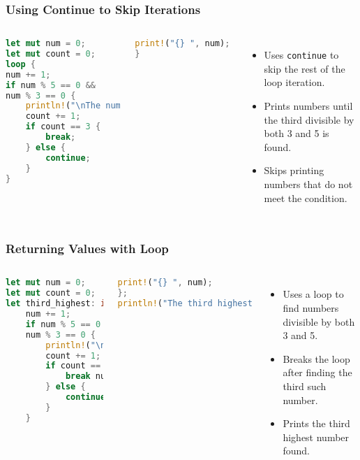 \documentclass[aspectratio=169, table]{beamer}
\begin{document}
\begin{frame}[fragile]
\frametitle{Using Continue to Skip Iterations}
\vspace{10pt}
\begin{columns}
\begin{lstlisting}[language=Rust]
let mut num = 0;
let mut count = 0;
loop {
num += 1;
if num % 5 == 0 && 
num % 3 == 0 {
	println!("\nThe number divisible by both 3 and 5 is: {}\n", num);
	count += 1;
	if count == 3 {
		break;
	} else {
		continue;
	}
}
\end{lstlisting}

\begin{lstlisting}[language=Rust]
print!("{} ", num); // This line is skipped due to continue
}
\end{lstlisting}
\begin{itemize}
\item Uses \texttt{continue} to skip the rest of the loop iteration.
\item Prints numbers until the third divisible by both 3 and 5 is found.
\item Skips printing numbers that do not meet the condition.
\end{itemize}
\end{columns}
\end{frame}


\begin{frame}[fragile]
\frametitle{Returning Values with Loop}
\vspace{10pt}
\begin{columns}
\begin{lstlisting}[language=Rust]
let mut num = 0;
let mut count = 0;
let third_highest: i32 = loop {
	num += 1;
	if num % 5 == 0 && 
	num % 3 == 0 {
		println!("\nNumber divisible by 3 and 5: {}\n", num);
		count += 1;
		if count == 3 {
			break num;
		} else {
			continue;
		}
	}
\end{lstlisting}

\begin{lstlisting}[language=Rust]
	print!("{} ", num);
};
println!("The third highest number divisible by both 3 and 5 is {}", third_highest);
\end{lstlisting}

\begin{itemize}
\item Uses a loop to find numbers divisible by both 3 and 5.
\item Breaks the loop after finding the third such number.
\item Prints the third highest number found.
\end{itemize}
\end{columns}
\end{frame}
\end{document}
